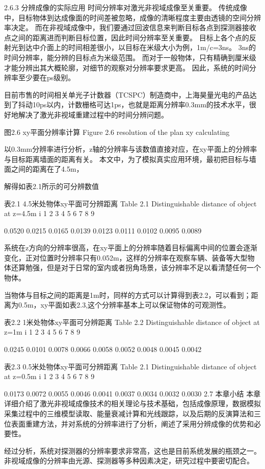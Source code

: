 2.6.3  分辨成像的实际应用
时间分辨率对激光非视域成像至关重要。
传统成像中，目标物体到达成像面的时间差被忽略，成像的清晰程度主要由透镜的空间分辨率决定。
而在非视域成像中，我们要通过回波信息来判断目标各点到探测器接收点之间的距离进而判断目标位置，因此时间分辨率至关重要。
目标上各个点的反射光到达中介面上的时间相差很小，以目标在米级大小为例，1m/c=3ns。
3ns的时间分辨率，能分辨的目标点为米级范围。
而对于一般物体，只有精确到厘米级才能分辨出其大概轮廓，对细节的观察对分辨率要求更高。
因此，系统的时间分辨率至少要在ps级别。

目前市售的时间相关单光子计数器（TCSPC）制造商中，上海昊量光电的产品达到了抖动10ps以内，计数栅格可达1ps，也就是距离分辨率0.3mm的技术水平，很好地解决了激光非视域重建过程中的时间分辨问题。


 
图2.6  xy平面分辨率计算
Figure 2.6 resolution of the plan xy calculating

以0.3mm分辨率进行分析，z轴的分辨率与该数值直接对应，在xy平面上的分辨率与目标距离墙面的距离有关。
本文中，为了模拟真实应用环境，最初把目标与墙面之间的距离在了4.5m，
  
解得如表2.1所示的可分辨数值

表2.1  4.5米处物体xy平面可分辨距离
Table 2.1 Distinguishable distance of object at z=4.5m
i	1	2	3	4	5	6	7	8	9
 
0.0520	0.0215	0.0165	0.0139	0.0123	0.0111	0.0102	0.0095	0.0089

系统在z方向的分辨率很高，在xy平面上的分辨率随着目标偏离中间的位置会逐渐变化，正对位置时分辨率只有0.052m，这样的分辨率在观察车辆、装备等大型物体还算勉强，但是对于日常的室内或者拐角场景，该分辨率不足以看清楚任何一个物体。

当物体与目标之间的距离是1m时，同样的方式可以计算得到表2.2，可以看到；距离为0.5m，xy平面如表2.3,这个分辨率基本上可以保证物体的可观测性。


表2.2  1米处物体xy平面可分辨距离
Table 2.2 Distinguishable distance of object at z=1m
i	1	2	3	4	5	6	7	8	9
 
0.0245	0.0101	0.0078	0.0066	0.0058	0.0052	0.0048	0.0045	0.0042

表2.3  0.5米处物体xy平面可分辨距离 
Table 2.1 Distinguishable distance of object at z=0.5m
i	1	2	3	4	5	6	7	8	9
 
0.0173                                  	0.0072	0.0055	0.0046	0.0041	0.0037	0.0034	0.0032	0.0030
2.7  本章小结
本章详细介绍了激光非视域成像技术的相关理论与技术基础，包括成像原理，数据模拟采集过程中的三维模型读取、能量衰减计算和光线跟踪，以及后期的反演算法和三位表面重建方法，并对系统的分辨率进行了分析，阐述了采用分辨成像的优势和必要性。

经过分析，系统对探测器的分辨率要求非常高，这也是目前系统发展的瓶颈之一。
非视域成像的分辨率由光源、探测器等多种因素决定，研究过程中要密切配合。

